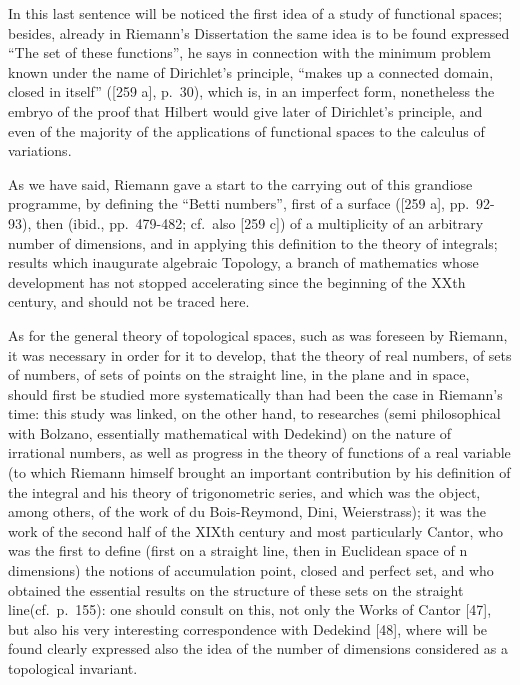 In this last sentence will be noticed the first idea of a study of functional spaces; besides, already in Riemann's Dissertation the same idea is to be found expressed ``The set of these functions'', he says in connection with the minimum problem known under the name of Dirichlet's principle, ``makes up a connected domain, closed in itself'' ({[}259 a{]}, p.~30), which is, in an imperfect form, nonetheless the embryo of the proof that Hilbert would give later of Dirichlet's principle, and even of the majority of the applications of functional spaces to the calculus of variations.

As we have said, Riemann gave a start to the carrying out of this grandiose programme, by defining the ``Betti numbers'', first of a surface ({[}259 a{]}, pp.~92-93), then (ibid., pp.~479-482; cf.~also {[}259 c{]}) of a multiplicity of an arbitrary number of dimensions, and in applying this definition to the theory of integrals; results which inaugurate algebraic Topology, a branch of mathematics whose development has not stopped accelerating since the beginning of the XXth century, and should not be traced here.

As for the general theory of topological spaces, such as was foreseen by Riemann, it was necessary in order for it to develop, that the theory of real numbers, of sets of numbers, of sets of points on the straight line, in the plane and in space, should first be studied more systematically than had been the case in Riemann's time: this study was linked, on the other hand, to researches (semi philosophical with Bolzano, essentially mathematical with Dedekind) on the nature of irrational numbers, as well as progress in the theory of functions of a real variable (to which Riemann himself brought an important contribution by his definition of the integral and his theory of trigonometric series, and which was the object, among others, of the work of du Bois-Reymond, Dini, Weierstrass); it was the work of the second half of the XIXth century and most particularly Cantor, who was the first to define (first on a straight line, then in Euclidean space of n dimensions) the notions of accumulation point, closed and perfect set, and who obtained the essential results on the structure of these sets on the straight line(cf.~p.~155): one should consult on this, not only the Works of Cantor {[}47{]}, but also his very interesting correspondence with Dedekind {[}48{]}, where will be found clearly expressed also the idea of the number of dimensions considered as a topological invariant.

